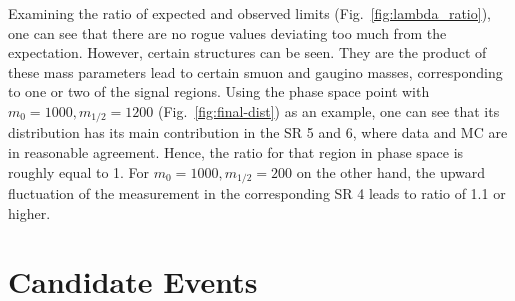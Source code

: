 Examining the ratio of expected and observed limits (Fig.~\ref{fig:lambda_ratio}), one can see that there are no rogue values deviating too much from the expectation. However, certain structures can be seen. They are the product of these mass parameters lead to certain smuon and gaugino masses, corresponding to one or two of the signal regions. Using the phase space point with $m_0 = 1000, m_{1/2} = 1200$ (Fig.~\ref{fig:final-dist}) as an example, one can see that its distribution has its main contribution in the SR 5 and 6, where data and MC are in reasonable agreement. Hence, the ratio for that region in phase space is roughly equal to 1. For $m_0 = 1000, m_{1/2} = 200$ on the other hand, the upward fluctuation of the measurement in the corresponding SR 4 leads to ratio of 1.1 or higher.


\section{Candidate Events}
\label{sec:candidate-events}

